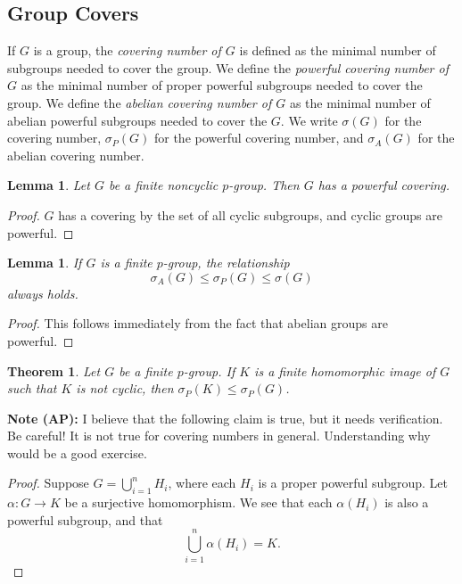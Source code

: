 \documentclass{amsart}
\numberwithin{equation} {section}
\newtheorem{theorem}[equation]{Theorem}
\newtheorem{lemma}[equation]{Lemma}
\theoremstyle{definition}
\begin{document}
\subsection{Group Covers}

If $G$ is a group,  the \textit{covering number of $G$} is defined as the minimal number of subgroups needed to cover the group. We define the \textit{powerful covering number of $G$} as the minimal number of proper powerful subgroups needed to cover the group. We define the \textit{abelian covering number of $G$} as the minimal number of abelian powerful subgroups needed to cover the $G$. We write $\sigma(G)$ for the covering number, $\sigma_P(G)$ for the powerful covering number, and $\sigma_A(G)$ for the abelian covering number. 

\begin{lemma}\label{l:all-p-groups-have-powerful-covers}
Let $G$ be a finite noncyclic $p$-group. Then $G$ has a powerful covering.
\end{lemma}

\begin{proof}
$G$ has a covering by the set of all cyclic subgroups, and cyclic groups are powerful. 
\end{proof}

\begin{lemma}\label{l:powerful-abelian-covering-relationship}
If $G$ is a finite $p$-group, the relationship
\[
\sigma_{A}(G) \leq \sigma_{P}(G) \leq \sigma(G)
\]
always holds. 
\end{lemma}

\begin{proof}
This follows immediately from the fact that abelian groups are powerful. 
\end{proof}

\begin{theorem}
Let $G$ be a finite $p$-group. If $K$ is a finite homomorphic image of $G$ such that $K$ is not cyclic, then $\sigma_P(K) \leq \sigma_P(G)$.
\end{theorem}

\textbf{Note (AP):} I believe that the following claim is true, but it needs verification. Be careful! It is not true for covering numbers in general. Understanding why would be a good exercise. 

\begin{proof}
 Suppose $G = \bigcup_{i=1}^n H_i$, where each $H_i$ is a proper powerful subgroup. Let $\alpha: G \rightarrow K$ be a surjective homomorphism. We see that each $\alpha(H_i)$ is also a powerful subgroup, and that \[
 \bigcup_{i=1}^n \alpha\left(H_i\right) = K.
 \]
\end{proof}
\end{document}
